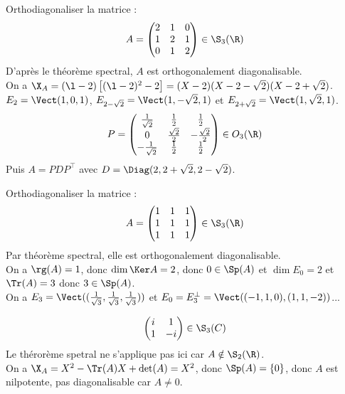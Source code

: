 \documentclass[11pt]{article}
\begin{document}
\begin{ex}{}{}
    Orthodiagonaliser la matrice :
    \begin{equation*}
        A=\begin{pmatrix}
          2 & 1 & 0 \\ 1 & 2 & 1 \\ 0 & 1 & 2   
        \end{pmatrix} \in \S_3(\R)
    \end{equation*}
    \tcblower
    D'après le théorème spectral, $A$ est orthogonalement diagonalisable.\\
    On a $\X_A = (\l-2)\left[ (\l - 2)^2 - 2 \right] = (X - 2)(X - 2 - \sqrt{2})(X - 2 + \sqrt{2})$.\\
    $E_2=\Vect(1,0,1)$, $E_{2-\sqrt{2}}=\Vect(1,-\sqrt{2},1)$ et $E_{2+\sqrt{2}}=\Vect(1,\sqrt{2},1)$.
    \begin{equation*}
        P = \begin{pmatrix}\frac{1}{\sqrt{2}} & \frac{1}{2} & \frac{1}{2} \\ 0 & \frac{\sqrt{2}}{2} & -\frac{\sqrt{2}}{2} \\ -\frac{1}{\sqrt{2}} & \frac{1}{2} & \frac{1}{2}\end{pmatrix}\in O_3(\R)
    \end{equation*}
    Puis $A=PDP^\top$ avec $D=\Diag(2,2+\sqrt{2},2-\sqrt{2})$.
\end{ex}

\begin{ex}{}{}
    Orthodiagonaliser la matrice :
    \begin{equation*}
        A = \begin{pmatrix}1&1&1\\1&1&1\\1&1&1\end{pmatrix} \in \S_3(\R)
    \end{equation*}
    \tcblower
    Par théorème spectral, elle est orthogonalement diagonalisable.\\
    On a $\rg(A)=1$, donc $\dim\Ker A = 2$, donc $0\in\Sp(A)$ et $\dim E_0 = 2$ et $\Tr(A)=3$ donc $3\in\Sp(A)$.\\
    On a $E_3=\Vect((\frac{1}{\sqrt{3}}, \frac{1}{\sqrt{3}}, \frac{1}{\sqrt{3}}))$ et $E_0=E_3^\bot=\Vect((-1,1,0),(1,1,-2))$...
\end{ex}

\begin{ex}{}{}
    \begin{equation*}
        \begin{pmatrix}
            i&1\\1&-i 
        \end{pmatrix} \in \S_3(C)
    \end{equation*}
    \tcblower
    Le thérorème spetral ne s'applique pas ici car $A\notin\S_2(\R)$.\\
    On a $\X_A=X^2-\Tr(A)X+\det(A)=X^2$, donc $\Sp(A)=\{0\}$, donc $A$ est nilpotente, pas diagonalisable car $A\neq0$.
\end{ex}
\end{document}
